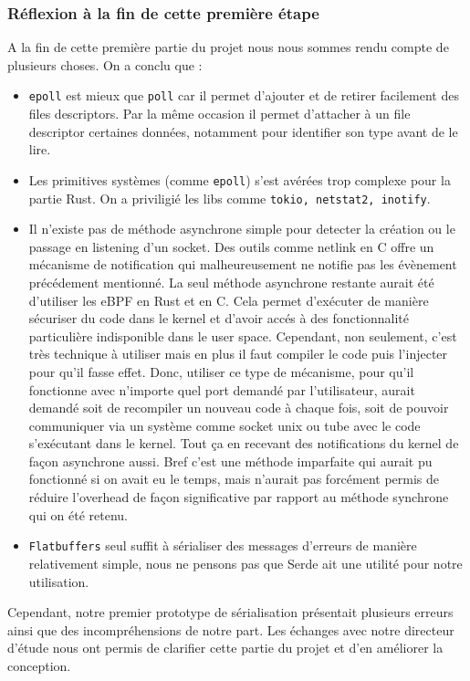 \documentclass{article}
\begin{document}
\subsubsection{Réflexion à la fin de cette première étape}

A la fin de cette première partie du projet nous nous sommes rendu compte de plusieurs choses. On a conclu que : 
\begin{itemize}
    \item \texttt{epoll} est mieux que \texttt{poll} car il permet d'ajouter et de retirer facilement des files descriptors. Par la même occasion il permet d’attacher à un file descriptor certaines données, notamment pour identifier son type avant de le lire.
    \item Les primitives systèmes (comme \texttt{epoll}) s'est avérées trop complexe pour la partie Rust. On a priviligié les libs comme \texttt{tokio, netstat2, inotify}.
    \item Il n'existe pas de méthode asynchrone simple pour detecter la création ou le passage en listening d'un socket. Des outils comme netlink en C offre un mécanisme de notification qui malheureusement ne notifie pas les évènement précédement mentionné. La seul méthode asynchrone restante aurait été d'utiliser les eBPF en Rust et en C. Cela permet d'exécuter de manière sécuriser du code dans le kernel et d'avoir accés à des fonctionnalité particulière indisponible dans le user space. Cependant, non seulement, c'est très technique à utiliser mais en plus il faut compiler le code puis l'injecter pour qu'il fasse effet. Donc, utiliser ce type de mécanisme, pour qu'il fonctionne avec n'importe quel port demandé par l'utilisateur, aurait demandé soit de recompiler un nouveau code à chaque fois, soit de pouvoir communiquer via un système comme socket unix ou tube avec le code s'exécutant dans le kernel. Tout ça en recevant des notifications du kernel de façon asynchrone aussi. Bref c'est une méthode imparfaite qui aurait pu fonctionné si on avait eu le temps, mais n'aurait pas forcément permis de réduire l'overhead de façon significative par rapport au méthode synchrone qui on été retenu.
    \item \texttt{Flatbuffers} seul suffit à sérialiser des messages d’erreurs de manière relativement simple, nous ne pensons pas que Serde ait une utilité pour notre utilisation.
\end{itemize}

Cependant, notre premier prototype de sérialisation présentait plusieurs erreurs ainsi que des incompréhensions de notre part. Les échanges avec notre directeur d’étude nous ont permis de clarifier cette partie du projet et d’en améliorer la conception.
\end{document}
